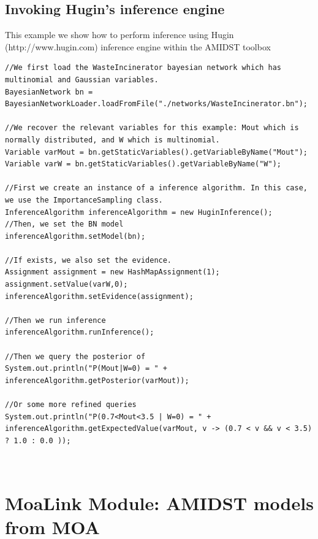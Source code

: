 \section{Invoking Hugin's inference engine}

This example we show how to perform inference using Hugin (http://www.hugin.com) inference engine within the AMIDST toolbox

\begin{lstlisting}
//We first load the WasteIncinerator bayesian network which has multinomial and Gaussian variables.
BayesianNetwork bn = BayesianNetworkLoader.loadFromFile("./networks/WasteIncinerator.bn");

//We recover the relevant variables for this example: Mout which is normally distributed, and W which is multinomial.
Variable varMout = bn.getStaticVariables().getVariableByName("Mout");
Variable varW = bn.getStaticVariables().getVariableByName("W");

//First we create an instance of a inference algorithm. In this case, we use the ImportanceSampling class.
InferenceAlgorithm inferenceAlgorithm = new HuginInference();
//Then, we set the BN model
inferenceAlgorithm.setModel(bn);

//If exists, we also set the evidence.
Assignment assignment = new HashMapAssignment(1);
assignment.setValue(varW,0);
inferenceAlgorithm.setEvidence(assignment);

//Then we run inference
inferenceAlgorithm.runInference();

//Then we query the posterior of
System.out.println("P(Mout|W=0) = " + inferenceAlgorithm.getPosterior(varMout));

//Or some more refined queries
System.out.println("P(0.7<Mout<3.5 | W=0) = " + inferenceAlgorithm.getExpectedValue(varMout, v -> (0.7 < v && v < 3.5) ? 1.0 : 0.0 ));

\end{lstlisting}


\begin{lstlisting}


\end{lstlisting}

\chapter{MoaLink Module: AMIDST models from MOA}\label{sec:codeExamples}


